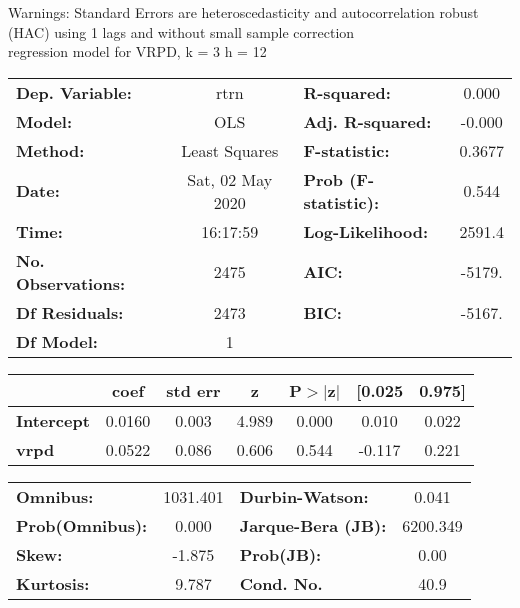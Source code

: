 Warnings: \newline
 [1] Standard Errors are heteroscedasticity and autocorrelation robust (HAC) using 1 lags and without small sample correction\\ 

regression model for VRPD, k = 3 h = 12\begin{center}
\begin{tabular}{lclc}
\toprule
\textbf{Dep. Variable:}    &       rtrn       & \textbf{  R-squared:         } &     0.000   \\
\textbf{Model:}            &       OLS        & \textbf{  Adj. R-squared:    } &    -0.000   \\
\textbf{Method:}           &  Least Squares   & \textbf{  F-statistic:       } &    0.3677   \\
\textbf{Date:}             & Sat, 02 May 2020 & \textbf{  Prob (F-statistic):} &    0.544    \\
\textbf{Time:}             &     16:17:59     & \textbf{  Log-Likelihood:    } &    2591.4   \\
\textbf{No. Observations:} &        2475      & \textbf{  AIC:               } &    -5179.   \\
\textbf{Df Residuals:}     &        2473      & \textbf{  BIC:               } &    -5167.   \\
\textbf{Df Model:}         &           1      & \textbf{                     } &             \\
\bottomrule
\end{tabular}
\begin{tabular}{lcccccc}
                   & \textbf{coef} & \textbf{std err} & \textbf{z} & \textbf{P$> |$z$|$} & \textbf{[0.025} & \textbf{0.975]}  \\
\midrule
\textbf{Intercept} &       0.0160  &        0.003     &     4.989  &         0.000        &        0.010    &        0.022     \\
\textbf{vrpd}      &       0.0522  &        0.086     &     0.606  &         0.544        &       -0.117    &        0.221     \\
\bottomrule
\end{tabular}
\begin{tabular}{lclc}
\textbf{Omnibus:}       & 1031.401 & \textbf{  Durbin-Watson:     } &    0.041  \\
\textbf{Prob(Omnibus):} &   0.000  & \textbf{  Jarque-Bera (JB):  } & 6200.349  \\
\textbf{Skew:}          &  -1.875  & \textbf{  Prob(JB):          } &     0.00  \\
\textbf{Kurtosis:}      &   9.787  & \textbf{  Cond. No.          } &     40.9  \\
\bottomrule
\end{tabular}
\end{center}

